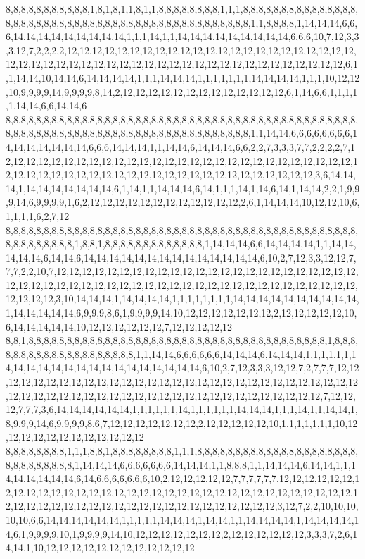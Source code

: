 8,8,8,8,8,8,8,8,8,8,8,1,8,1,8,1,1,8,1,1,8,8,8,8,8,8,8,8,1,1,1,8,8,8,8,8,8,8,8,8,8,8,8,8,8,8,8,8,8,8,8,8,8,8,8,8,8,8,8,8,8,8,8,8,8,8,8,8,8,8,8,8,8,8,8,8,8,8,1,1,8,8,8,8,1,14,14,14,6,6,6,14,14,14,14,14,14,14,14,14,1,1,1,14,1,1,14,14,14,14,14,14,14,14,14,6,6,6,10,7,12,3,3,3,12,7,2,2,2,2,12,12,12,12,12,12,12,12,12,12,12,12,12,12,12,12,12,12,12,12,12,12,12,12,12,12,12,12,12,12,12,12,12,12,12,12,12,12,12,12,12,12,12,12,12,12,12,12,12,12,6,1,1,14,14,10,14,14,6,14,14,14,14,1,1,1,14,14,14,1,1,1,1,1,1,1,14,14,14,14,1,1,1,10,12,12,10,9,9,9,9,14,9,9,9,9,8,14,2,12,12,12,12,12,12,12,12,12,12,12,12,12,6,1,14,6,6,1,1,1,1,1,14,14,6,6,14,14,6
8,8,8,8,8,8,8,8,8,8,8,8,8,8,8,8,8,8,8,8,8,8,8,8,8,8,8,8,8,8,8,8,8,8,8,8,8,8,8,8,8,8,8,8,8,8,8,8,8,8,8,8,8,8,8,8,8,8,8,8,8,8,8,8,8,8,8,8,8,8,8,8,8,8,8,8,8,8,1,1,14,14,6,6,6,6,6,6,6,6,14,14,14,14,14,14,14,6,6,6,14,14,14,1,1,14,14,6,14,14,14,6,6,2,2,7,3,3,3,7,7,2,2,2,2,7,12,12,12,12,12,12,12,12,12,12,12,12,12,12,12,12,12,12,12,12,12,12,12,12,12,12,12,12,12,12,12,12,12,12,12,12,12,12,12,12,12,12,12,12,12,12,12,12,12,12,12,12,12,3,6,14,14,14,1,14,14,14,14,14,14,14,6,1,14,1,1,14,14,14,6,14,1,1,1,14,1,14,6,14,1,14,14,2,2,1,9,9,9,14,6,9,9,9,9,1,6,2,12,12,12,12,12,12,12,12,12,12,12,12,2,6,1,14,14,14,10,12,12,10,6,1,1,1,1,6,2,7,12
8,8,8,8,8,8,8,8,8,8,8,8,8,8,8,8,8,8,8,8,8,8,8,8,8,8,8,8,8,8,8,8,8,8,8,8,8,8,8,8,8,8,8,8,8,8,8,8,8,8,8,8,8,8,8,1,8,8,1,8,8,8,8,8,8,8,8,8,8,8,8,8,1,14,14,14,6,6,14,14,14,14,1,1,14,14,14,14,14,6,14,14,6,14,14,14,14,14,14,14,14,14,14,14,14,14,14,6,10,2,7,12,3,3,12,12,7,7,7,2,2,10,7,12,12,12,12,12,12,12,12,12,12,12,12,12,12,12,12,12,12,12,12,12,12,12,12,12,12,12,12,12,12,12,12,12,12,12,12,12,12,12,12,12,12,12,12,12,12,12,12,12,12,12,12,12,12,12,12,3,10,14,14,14,1,14,14,14,14,1,1,1,1,1,1,1,1,14,14,14,14,14,14,14,14,14,14,1,14,14,14,14,14,6,9,9,9,8,6,1,9,9,9,9,14,10,12,12,12,12,12,12,12,2,12,12,12,12,12,10,6,14,14,14,14,14,10,12,12,12,12,12,12,7,12,12,12,12,12
8,8,1,8,8,8,8,8,8,8,8,8,8,8,8,8,8,8,8,8,8,8,8,8,8,8,8,8,8,8,8,8,8,8,8,8,8,8,8,8,8,8,1,8,8,8,8,8,8,8,8,8,8,8,8,8,8,8,8,8,8,8,8,1,1,14,14,6,6,6,6,6,6,14,14,14,6,14,14,14,1,1,1,1,1,1,14,14,14,14,14,14,14,14,14,14,14,14,14,14,14,14,6,10,2,7,12,3,3,3,12,12,7,2,7,7,7,12,12,12,12,12,12,12,12,12,12,12,12,12,12,12,12,12,12,12,12,12,12,12,12,12,12,12,12,12,12,12,12,12,12,12,12,12,12,12,12,12,12,12,12,12,12,12,12,12,12,12,12,12,12,12,7,12,12,12,7,7,7,3,6,14,14,14,14,14,14,1,1,1,1,1,1,14,1,1,1,1,1,1,14,14,14,1,1,1,14,1,1,14,14,1,8,9,9,9,14,6,9,9,9,9,8,6,7,12,12,12,12,12,12,12,2,12,12,12,12,12,10,1,1,1,1,1,1,1,10,12,12,12,12,12,12,12,12,12,12,12,12
8,8,8,8,8,8,8,8,1,1,1,8,8,1,8,8,8,8,8,8,8,8,1,1,1,8,8,8,8,8,8,8,8,8,8,8,8,8,8,8,8,8,8,8,8,8,8,8,8,8,8,8,8,8,8,1,14,14,14,6,6,6,6,6,6,6,14,14,14,1,1,8,8,8,1,1,14,14,14,6,14,14,1,1,14,14,14,14,14,14,6,14,6,6,6,6,6,6,6,10,2,12,12,12,12,12,7,7,7,7,7,7,12,12,12,12,12,12,12,12,12,12,12,12,12,12,12,12,12,12,12,12,12,12,12,12,12,12,12,12,12,12,12,12,12,12,12,12,12,12,12,12,12,12,12,12,12,12,12,12,12,12,12,12,12,12,12,12,3,12,7,2,2,10,10,10,10,10,6,6,14,14,14,14,14,14,1,1,1,1,1,14,14,14,1,14,14,1,1,14,14,14,14,1,14,14,14,14,14,6,1,9,9,9,9,10,1,9,9,9,9,14,10,12,12,12,12,12,12,12,2,12,12,12,12,12,12,3,3,3,7,2,6,14,14,1,10,12,12,12,12,12,12,12,12,12,12,12,12
